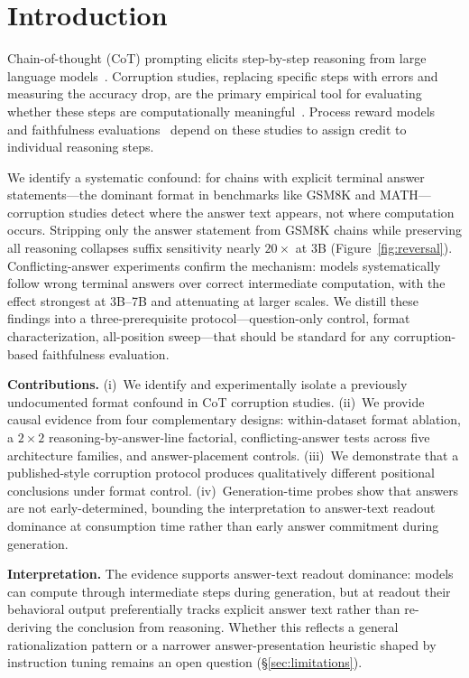 \documentclass{article}
\theoremstyle{definition}
\theoremstyle{definition}
\begin{document}
\section{Introduction}
\label{sec:intro}

Chain-of-thought (CoT) prompting elicits step-by-step reasoning from large
language models~\citep{wei2022}. Corruption studies, replacing specific steps
with errors and measuring the accuracy drop, are the primary empirical tool
for evaluating whether these steps are computationally
meaningful~\citep{lanham2023,turpin2023,pfau2024}. Process reward
models~\citep{lightman2023} and faithfulness evaluations~\citep{turpin2023}
depend on these studies to assign credit to individual reasoning steps.

We identify a systematic confound: for chains with explicit terminal answer
statements---the dominant format in benchmarks like GSM8K and MATH---corruption
studies detect where the answer text appears, not where computation occurs.
Stripping only the answer statement from GSM8K chains while preserving all
reasoning collapses suffix sensitivity nearly $20\times$ at 3B
(Figure~\ref{fig:reversal}). Conflicting-answer experiments confirm the
mechanism: models systematically follow wrong terminal answers over correct
intermediate computation, with the effect strongest at 3B--7B and attenuating
at larger scales. We distill these findings into a three-prerequisite
protocol---question-only control, format characterization, all-position
sweep---that should be standard for any corruption-based faithfulness
evaluation.

\textbf{Contributions.} (i)~We identify and experimentally isolate a previously
undocumented format confound in CoT corruption studies. (ii)~We provide causal
evidence from four complementary designs: within-dataset format ablation, a
$2{\times}2$ reasoning-by-answer-line factorial, conflicting-answer tests
across five architecture families, and answer-placement controls. (iii)~We
demonstrate that a published-style corruption protocol produces qualitatively
different positional conclusions under format control. (iv)~Generation-time
probes show that answers are not early-determined, bounding the interpretation
to answer-text readout dominance at consumption time rather than early answer
commitment during generation.

\textbf{Interpretation.} The evidence supports answer-text readout dominance:
models can compute through intermediate steps during generation, but at readout
their behavioral output preferentially tracks explicit answer text rather than
re-deriving the conclusion from reasoning. Whether this reflects a general
rationalization pattern or a narrower answer-presentation heuristic shaped by
instruction tuning remains an open question (\S\ref{sec:limitations}).
\end{document}
